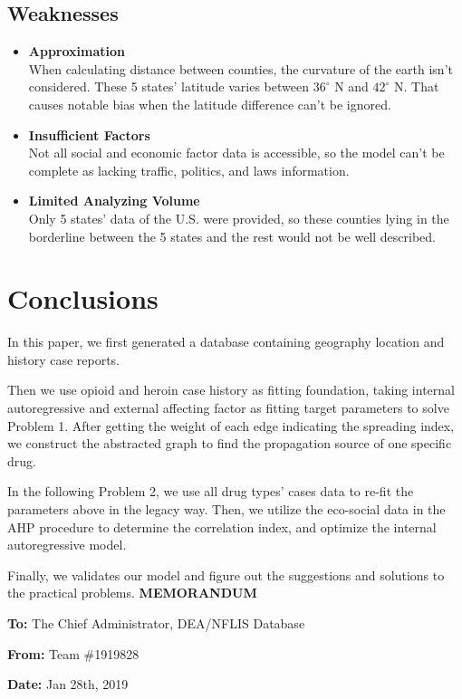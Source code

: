 \documentclass{mcmthesis}
\begin{document}
\subsection{Weaknesses}
\begin{itemize}
	\item \textbf{Approximation}\\
	 When calculating distance between counties, the curvature of the earth isn’t considered. These 5 states’ latitude varies between $36^\circ$ N and $42^\circ$ N. That causes notable bias when the latitude difference can’t be ignored.
	\item \textbf{Insufficient Factors}\\
	 Not all social and economic factor data is accessible, so the model can’t be complete as lacking traffic, politics, and laws information.
	\item \textbf{Limited Analyzing Volume}\\
	 Only 5 states’ data of the U.S. were provided, so these counties lying in the borderline between the 5 states and the rest would not be well described.
\end{itemize}

\section{Conclusions}
In this paper, we first generated a database containing geography location and history case reports. 

Then we use opioid and heroin case history as fitting foundation, taking internal autoregressive and external affecting factor as fitting target parameters to solve Problem 1. After getting the weight of each edge indicating the spreading index, we construct the abstracted graph to find the propagation source of one specific drug. 

In the following Problem 2, we use all drug types’ cases data to re-fit the parameters above in the legacy way. Then, we utilize the eco-social data in the AHP procedure to determine the correlation index, and optimize the internal autoregressive model. 

Finally, we validates our model and figure out the suggestions and solutions to the practical problems.
\newpage
\Large\textbf{MEMORANDUM}

\normalsize \textbf{To:} The Chief Administrator, DEA/NFLIS Database

\textbf{From:} Team \#1919828

\textbf{Date:} Jan 28th, 2019
\end{document}
